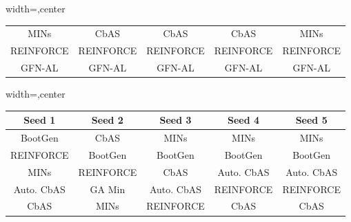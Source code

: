 \begin{table*}[t!]
\begin{minipage}{.48\textwidth}
\begin{adjustbox}{width=\linewidth,center}
\begin{tabular}{|c|c|c|c|c|}
\cellcolor[HTML]{D0E0E3}MINs & \cellcolor[HTML]{FCE5CD}CbAS & \cellcolor[HTML]{FCE5CD}CbAS & \cellcolor[HTML]{FCE5CD}CbAS & \cellcolor[HTML]{D0E0E3}MINs \\ 
\cellcolor[HTML]{FFF2CC}REINFORCE & \cellcolor[HTML]{FFF2CC}REINFORCE & \cellcolor[HTML]{FFF2CC}REINFORCE & \cellcolor[HTML]{FFF2CC}REINFORCE & \cellcolor[HTML]{FFF2CC}REINFORCE \\ 
\cellcolor[HTML]{F8E3A6}GFN-AL  & \cellcolor[HTML]{F8E3A6}GFN-AL  & \cellcolor[HTML]{F8E3A6}GFN-AL  & \cellcolor[HTML]{F8E3A6}GFN-AL  & \cellcolor[HTML]{F8E3A6}GFN-AL  \\ 


 
            \bottomrule
            \end{tabular}
            \end{adjustbox}
      \caption*{(a) UTR Design Bench oracle}
      \label{tab:utr_rankings}
    \end{minipage}%
    \hfill
    \begin{minipage}{.48\textwidth}
      \centering
      \begin{adjustbox}{width=\linewidth,center}
      \begin{tabular}{|c|c|c|c|c|}
        \toprule 
            \textbf{Seed 1}                                                 & \textbf{Seed 2}                                          & \textbf{Seed 3}                                          & \textbf{Seed 4}                            & \textbf{Seed 5}                         \\ \midrule                      
            \cellcolor[HTML]{E6B8AF}BootGen & \cellcolor[HTML]{FCE5CD}CbAS & \cellcolor[HTML]{D0E0E3}MINs & \cellcolor[HTML]{D0E0E3}MINs & \cellcolor[HTML]{D0E0E3}MINs \\ 
\cellcolor[HTML]{FFF2CC}REINFORCE & \cellcolor[HTML]{E6B8AF}BootGen & \cellcolor[HTML]{E6B8AF}BootGen & \cellcolor[HTML]{E6B8AF}BootGen & \cellcolor[HTML]{E6B8AF}BootGen \\ 
\cellcolor[HTML]{D0E0E3}MINs & \cellcolor[HTML]{FFF2CC}REINFORCE & \cellcolor[HTML]{FCE5CD}CbAS & \cellcolor[HTML]{D9EAD3}Auto. CbAS & \cellcolor[HTML]{D9EAD3}Auto. CbAS \\ 
\cellcolor[HTML]{D9EAD3}Auto. CbAS & \cellcolor[HTML]{CFE2F3}GA Min & \cellcolor[HTML]{D9EAD3}Auto. CbAS & \cellcolor[HTML]{FFF2CC}REINFORCE & \cellcolor[HTML]{FFF2CC}REINFORCE \\ 
\cellcolor[HTML]{FCE5CD}CbAS & \cellcolor[HTML]{D0E0E3}MINs & \cellcolor[HTML]{FFF2CC}REINFORCE & \cellcolor[HTML]{FCE5CD}CbAS & \cellcolor[HTML]{FCE5CD}CbAS \\ 

\end{tabular}
\end{adjustbox}
\end{minipage}
\end{table*}
